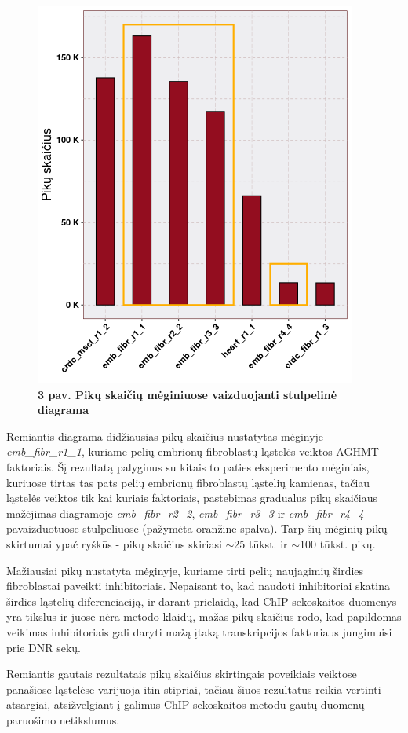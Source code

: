 \documentclass[12pt]{article}
\begin{document}
\begin{figure}[htb]
    \begin{center}
        \includegraphics[width=0.5\linewidth]{../Figures/total_peak_counts.png}
        \vspace{-2\baselineskip}
        \caption*{\small\textbf{3 pav. Pikų skaičių mėginiuose vaizduojanti
                                stulpelinė diagrama}}
    \end{center}
\end{figure}

Remiantis diagrama didžiausias pikų skaičius
nustatytas mėginyje \small\emph{emb\_fibr\_r1\_1}, kuriame pelių embrionų
fibroblastų ląstelės veiktos AGHMT faktoriais. Šį rezultatą palyginus su kitais
to paties eksperimento mėginiais, kuriuose tirtas tas pats pelių embrionų
fibroblastų ląstelių kamienas, tačiau ląstelės veiktos tik kai kuriais
faktoriais, pastebimas gradualus pikų skaičiaus mažėjimas diagramoje
\small\emph{emb\_fibr\_r2\_2}, \small\emph{emb\_fibr\_r3\_3} ir
\small\emph{emb\_fibr\_r4\_4} pavaizduotuose stulpeliuose (pažymėta oranžine
spalva). Tarp šių mėginių pikų skirtumai ypač ryškūs - pikų skaičius skiriasi
\(\sim\)25 tūkst. ir \(\sim\)100 tūkst. pikų.

Mažiausiai pikų nustatyta mėginyje, kuriame tirti pelių naujagimių širdies
fibroblastai paveikti inhibitoriais. Nepaisant to, kad naudoti inhibitoriai
skatina širdies ląstelių diferenciaciją\cite{HEART_CELL_DIFF_ARTCL}, ir darant
prielaidą, kad ChIP sekoskaitos duomenys yra tikslūs ir juose nėra metodo
klaidų, mažas pikų skaičius rodo, kad papildomas veikimas inhibitoriais gali
daryti mažą įtaką transkripcijos faktoriaus jungimuisi prie DNR sekų.

Remiantis gautais rezultatais pikų skaičius skirtingais poveikiais veiktose
panašiose ląstelėse varijuoja itin stipriai, tačiau šiuos rezultatus reikia
vertinti atsargiai, atsižvelgiant į galimus ChIP sekoskaitos metodu gautų
duomenų paruošimo netikslumus.
\end{document}
